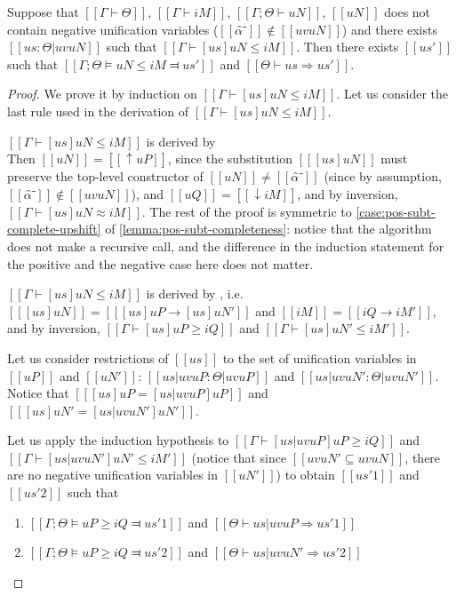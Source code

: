 \begin{lemma}
    Suppose that $[[Γ ⊢ Θ]]$, $[[Γ ⊢ iM]]$, $[[Γ ; Θ ⊢ uN]]$,
    $[[uN]]$ does not contain negative unification variables ($[[α̂⁻]] \notin [[uv uN]]$)
    and there exists $[[us : Θ | uv uN]]$ such that $[[ Γ ⊢ [us]uN ≤ iM ]]$.
    Then there exists $[[us']]$ such that $[[Γ ; Θ ⊨ uN ≤ iM ⫤ us']]$
    and $[[Θ ⊢ us ⇒ us']]$.
\end{lemma}
\begin{proof}
    We prove it by induction on $[[ Γ ⊢ [us]uN ≤ iM ]]$.
    Let us consider the last rule used in the derivation of $[[ Γ ⊢ [us]uN ≤ iM ]]$.
    \begin{caseof}
        \item $[[ Γ ⊢ [us]uN ≤ iM ]]$ is derived by \\
        Then $[[ uN ]] = [[ ↑uP ]]$, since
        the substitution $[[ [us]uN ]]$ must preserve the 
        top-level constructor of $[[uN]] \neq [[α̂⁻]]$ (since by assumption, $[[α̂⁻]] \notin [[uv uN]]$), 
        and $[[uQ]] = [[ ↓iM ]]$, and by inversion, $[[ Γ ⊢ [us]uN ≈ iM ]]$.
        The rest of the proof is symmetric to \cref{case:pos-subt-complete-upshift} of
         \cref{lemma:pos-subt-completeness}: notice that the algorithm does not make a recursive call, 
        and the difference in the induction statement for the positive and 
        the negative case here does not matter.

        \item $[[ Γ ⊢ [us]uN ≤ iM ]]$ is derived by , 
        i.e. $[[ [us]uN ]] = [[ [us]uP → [us]uN' ]]$ and $[[iM]] = [[iQ → iM']]$, 
        and by inversion, $[[ Γ ⊢ [us]uP ≥ iQ ]]$ and $[[ Γ ⊢ [us]uN' ≤ iM' ]]$.

        Let us consider restrictions of $[[us]]$ to 
        the set of unification variables in $[[uP]]$ and $[[uN']]$:
        $[[us | uv uP : Θ | uv uP]]$ and $[[us | uv uN' : Θ | uv uN']]$.
        Notice that 
        $[[ [us]uP = [us | uv uP]uP ]]$ and 
        $[[ [us]uN' = [us | uv uN']uN' ]]$.

       Let us apply the induction hypothesis to
       $[[ Γ ⊢ [us | uv uP]uP ≥ iQ ]]$ and
       $[[ Γ ⊢ [us | uv uN']uN' ≤ iM' ]]$ (notice that
       since $[[uv uN' ⊆ uv uN]]$, there are no negative unification variables in $[[uN']]$)
       to obtain $[[us'1]]$ and $[[us'2]]$ such that
       \begin{enumerate}
        \item $[[Γ; Θ ⊨ uP ≥ iQ ⫤ us'1]]$ and $[[Θ ⊢ us | uv uP ⇒ us'1]]$
        \item $[[Γ; Θ ⊨ uP ≥ iQ ⫤ us'2]]$ and $[[Θ ⊢ us | uv uN' ⇒ us'2]]$ 
       \end{enumerate}
       

\end{caseof}
\end{proof}
